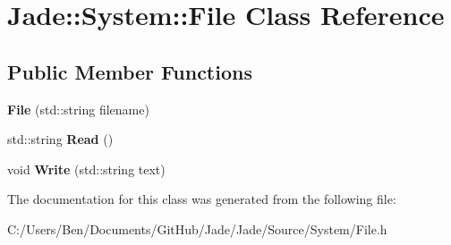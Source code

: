 \hypertarget{class_jade_1_1_system_1_1_file}{}\section{Jade\+:\+:System\+:\+:File Class Reference}
\label{class_jade_1_1_system_1_1_file}
\subsection*{Public Member Functions}
\begin{DoxyCompactItemize}
\item 
\hypertarget{class_jade_1_1_system_1_1_file_a01eddcc244a22eaa378143b391d86204}{}{\bfseries File} (std\+::string filename)\label{class_jade_1_1_system_1_1_file_a01eddcc244a22eaa378143b391d86204}

\item 
\hypertarget{class_jade_1_1_system_1_1_file_a9c33a1c82a59eecd7b9f046a2e8f6e3c}{}std\+::string {\bfseries Read} ()\label{class_jade_1_1_system_1_1_file_a9c33a1c82a59eecd7b9f046a2e8f6e3c}

\item 
\hypertarget{class_jade_1_1_system_1_1_file_a899a6baf153ab70bc6d5f1bf000c3888}{}void {\bfseries Write} (std\+::string text)\label{class_jade_1_1_system_1_1_file_a899a6baf153ab70bc6d5f1bf000c3888}

\end{DoxyCompactItemize}


The documentation for this class was generated from the following file\+:\begin{DoxyCompactItemize}
\item 
C\+:/\+Users/\+Ben/\+Documents/\+Git\+Hub/\+Jade/\+Jade/\+Source/\+System/File.\+h\end{DoxyCompactItemize}
